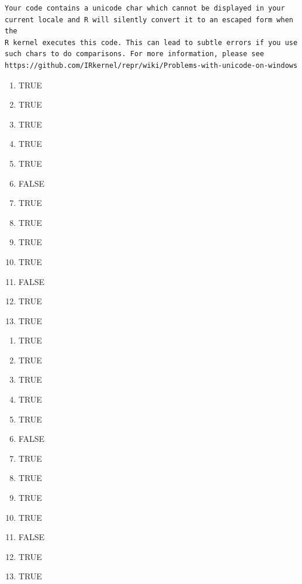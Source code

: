 \documentclass[
  letterpaper,
  DIV=11,
  numbers=noendperiod]{scrreprt}
\newenvironment{Shaded}{\begin{snugshade}}{\end{snugshade}}
\newcommand{\AttributeTok}[1]{\textcolor[rgb]{0.40,0.45,0.13}{#1}}
\newcommand{\CommentTok}[1]{\textcolor[rgb]{0.37,0.37,0.37}{#1}}
\newcommand{\ConstantTok}[1]{\textcolor[rgb]{0.56,0.35,0.01}{#1}}
\newcommand{\FunctionTok}[1]{\textcolor[rgb]{0.28,0.35,0.67}{#1}}
\newcommand{\NormalTok}[1]{\textcolor[rgb]{0.00,0.23,0.31}{#1}}
\newcommand{\SpecialCharTok}[1]{\textcolor[rgb]{0.37,0.37,0.37}{#1}}
\newcommand{\StringTok}[1]{\textcolor[rgb]{0.13,0.47,0.30}{#1}}
\providecommand{\tightlist}{%
  \setlength{\itemsep}{0pt}\setlength{\parskip}{0pt}}\usepackage{longtable,booktabs,array}
\begin{document}
\begin{Shaded}
\end{Shaded}

\begin{verbatim}
Your code contains a unicode char which cannot be displayed in your
current locale and R will silently convert it to an escaped form when the
R kernel executes this code. This can lead to subtle errors if you use
such chars to do comparisons. For more information, please see
https://github.com/IRkernel/repr/wiki/Problems-with-unicode-on-windows
\end{verbatim}

\begin{enumerate}
\def\labelenumi{\arabic{enumi}.}
\tightlist
\item
  TRUE
\item
  TRUE
\item
  TRUE
\item
  TRUE
\item
  TRUE
\item
  FALSE
\item
  TRUE
\item
  TRUE
\item
  TRUE
\item
  TRUE
\item
  FALSE
\item
  TRUE
\item
  TRUE
\end{enumerate}

\begin{enumerate}
\def\labelenumi{\arabic{enumi}.}
\tightlist
\item
  TRUE
\item
  TRUE
\item
  TRUE
\item
  TRUE
\item
  TRUE
\item
  FALSE
\item
  TRUE
\item
  TRUE
\item
  TRUE
\item
  TRUE
\item
  FALSE
\item
  TRUE
\item
  TRUE
\end{enumerate}
\end{document}
